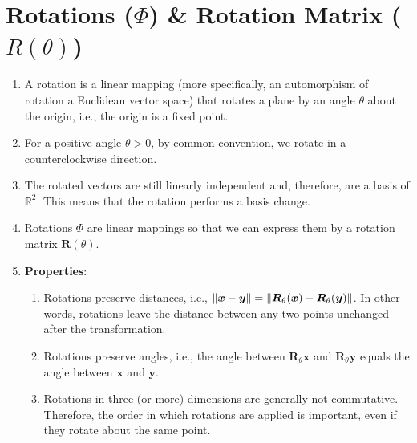 \section{Rotations ($\Phi$) \& Rotation Matrix ($R(\theta)$)}



\begin{enumerate}
    \item A rotation is a linear mapping (more specifically, an automorphism of rotation a Euclidean vector space) that rotates a plane by an angle $\theta$ about the origin, i.e., the origin is a fixed point.
    \hfill \cite{mfml/book/mml/Deisenroth-Faisal-Ong}
    
    \item For a positive angle $\theta > 0$, by common convention, we rotate in a counterclockwise direction.
    \hfill \cite{mfml/book/mml/Deisenroth-Faisal-Ong}

    \item The rotated vectors are still linearly independent and, therefore, are a basis of $\mathbb{R}^2$. 
    This means that the rotation performs a basis change.
    \hfill \cite{mfml/book/mml/Deisenroth-Faisal-Ong}

    \item Rotations $\Phi$ are linear mappings so that we can express them by a rotation matrix $\bm{R}(\theta)$. 
    \hfill \cite{mfml/book/mml/Deisenroth-Faisal-Ong}

    \item \textbf{Properties}:
    \begin{enumerate}
        \item Rotations preserve distances, i.e., $\left\| \bm{x}-\bm{y} \right\| = \left\| \bm{R}_\theta (\bm{x}) - \bm{R}_\theta (\bm{y}) \right\|$. In other words, rotations leave the distance between any two points unchanged after the transformation.
        \hfill \cite{mfml/book/mml/Deisenroth-Faisal-Ong}

        \item Rotations preserve angles, i.e., the angle between $\bm{R}_\theta \bm{x}$ and $\bm{R}_\theta \bm{y}$ equals the angle between $\bm{x}$ and $\bm{y}$.
        \hfill \cite{mfml/book/mml/Deisenroth-Faisal-Ong}

        \item Rotations in three (or more) dimensions are generally not commutative. 
        Therefore, the order in which rotations are applied is important, even if they rotate about the same point. 
        \hfill \cite{mfml/book/mml/Deisenroth-Faisal-Ong}
        

\end{enumerate}
\end{enumerate}
